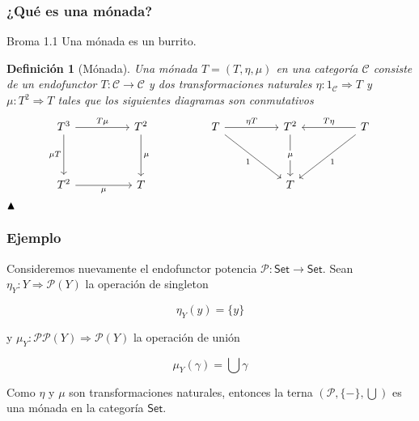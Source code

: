 \documentclass[10pt, aspectratio = 43,usenames,dvipsnames]{beamer}
\newtheorem{definicion}{Definición}
\begin{document}
	\begin{frame}[t]
		\frametitle{¿Qué es una mónada?}
		\begin{block}{Broma 1.1}
			Una mónada es un burrito.
		\end{block}
		\begin{definicion}[Mónada]
			Una mónada $T = (T,\eta, \mu)$ en una categoría $\mathcal{C}$  consiste de un endofunctor $T: \mathcal{C}\to\mathcal{C}$ y dos transformaciones naturales $\eta: 1_{\mathcal{C}}\Rightarrow T$ y $\mu: T^{2}\Rightarrow T$ tales que los siguientes diagramas son conmutativos
			\[\begin{tikzcd}[ampersand replacement=\&]
				{T^{3}} \&\& {T^{2}} \&\& T \&\& {T^{2}} \&\& T \\
				\\
				{T^{2}} \&\& T \&\&\&\& T
				\arrow["{T\mu}", from=1-1, to=1-3]
				\arrow["{\mu T}"', from=1-1, to=3-1]
				\arrow["\mu", from=1-3, to=3-3]
				\arrow["{\eta T}", from=1-5, to=1-7]
				\arrow["1"', from=1-5, to=3-7]
				\arrow["\mu"{description}, from=1-7, to=3-7]
				\arrow["{T\eta}"', from=1-9, to=1-7]
				\arrow["1", from=1-9, to=3-7]
				\arrow["\mu"', from=3-1, to=3-3]
			\end{tikzcd}\]
		$\hfill\blacktriangle$
		\end{definicion}
	\end{frame}
	
	\begin{frame}[t]
		\frametitle{Ejemplo}
		Consideremos nuevamente el endofunctor potencia $\mathcal{P}: \mathsf{Set}\to\mathsf{Set}$. Sean $\eta_{Y}: Y\Rightarrow\mathcal{P}(Y)$ la operación de singleton 
		
		$$\eta_{Y}(y) = \{y\}$$
		
		y $\mu_{Y}:\mathcal{P}\mathcal{P}(Y)\Rightarrow\mathcal{P}(Y)$ la operación de unión 
		
		$$\mu_{Y}(\gamma) = \bigcup\gamma$$
		
		Como $\eta$ y $\mu$ son transformaciones naturales, entonces la terna $(\mathcal{P}, \{-\}, \bigcup)$ es una mónada en la categoría $\mathsf{Set}$.
	\end{frame}
	
\end{document}
